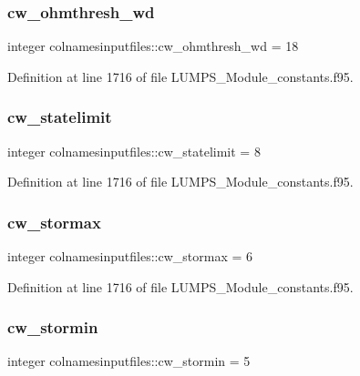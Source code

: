 \subsubsection{\texorpdfstring{cw\+\_\+ohmthresh\+\_\+wd}{cw\_ohmthresh\_wd}}
{\footnotesize\ttfamily integer colnamesinputfiles\+::cw\+\_\+ohmthresh\+\_\+wd = 18}



Definition at line 1716 of file L\+U\+M\+P\+S\+\_\+\+Module\+\_\+constants.\+f95.

\mbox{\label{namespacecolnamesinputfiles_a34c411defdc0da75fe0d6854e45b266a}} 
\subsubsection{\texorpdfstring{cw\+\_\+statelimit}{cw\_statelimit}}
{\footnotesize\ttfamily integer colnamesinputfiles\+::cw\+\_\+statelimit = 8}



Definition at line 1716 of file L\+U\+M\+P\+S\+\_\+\+Module\+\_\+constants.\+f95.

\mbox{\label{namespacecolnamesinputfiles_afdb6de5a5e1d3f406ad7cfd67ef16f42}} 
\subsubsection{\texorpdfstring{cw\+\_\+stormax}{cw\_stormax}}
{\footnotesize\ttfamily integer colnamesinputfiles\+::cw\+\_\+stormax = 6}



Definition at line 1716 of file L\+U\+M\+P\+S\+\_\+\+Module\+\_\+constants.\+f95.

\mbox{\label{namespacecolnamesinputfiles_ab9b7bbe6f000d46892c066dc0586a9b3}} 
\subsubsection{\texorpdfstring{cw\+\_\+stormin}{cw\_stormin}}
{\footnotesize\ttfamily integer colnamesinputfiles\+::cw\+\_\+stormin = 5}



